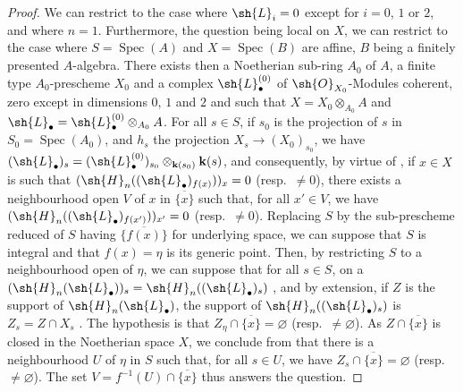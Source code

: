 \begin{proof}
\label{IV.9.9.6-proof}
We can restrict to the case where $\sh{L}_i=0$ except for $i=0$, $1$ or $2$, and where $n=1$.
Furthermore, the question being local on $X$, we can restrict to the case where $S=\operatorname{Spec}(A)$ and $X=\operatorname{Spec}(B)$ are affine, $B$ being a finitely presented $A$-algebra.
There exists then a Noetherian sub-ring $A_0$ of $A$, a finite type $A_0$-prescheme $X_0$ and a complex $\sh{L}_\bullet^{(0)}$ of $\sh{O}_{X_0}$-Modules coherent, zero except in dimensions $0$, $1$ and $2$ and such that $X=X_0\otimes_{A_0}A$ and $\sh{L}_\bullet=\sh{L}_\bullet^{(0)}\otimes_{A_0}A$.
For all $s\in S$, if $s_0$ is the projection of $s$ in $S_0=\operatorname{Spec}(A_0)$, and $h_s$ the projection $X_s\to(X_0)_{s_0}$, we have $(\sh{L}_\bullet)_s=(\sh{L}_\bullet^{(0)})_{s_0}\otimes_{\mathbf{k}(s_0)}\mathbf{k}(s)$, and consequently, by virtue of , if $x\in X$ is such that $(\sh{H}_n((\sh{L}_\bullet)_{f(x)}))_x=0$ (resp.~$\neq 0$), there exists a neighbourhood open $V$ of $x$ in $\overline{\{x\}}$ such that, for all $x'\in V$, we have $(\sh{H}_n((\sh{L}_\bullet)_{f(x')}))_{x'}=0$ (resp.~$\neq 0$).
Replacing $S$ by the sub-prescheme reduced of $S$ having $\overline{\{f(x)\}}$ for underlying space, we can suppose that $S$ is integral and that $f(x)=\eta$ is its generic point.
Then, by restricting $S$ to a neighbourhood open of $\eta$, we can suppose that for all $s\in S$, on a $(\sh{H}_n(\sh{L}_\bullet))_s=\sh{H}_n((\sh{L}_\bullet)_s)$ , and by extension, if $Z$ is the support of $\sh{H}_n(\sh{L}_\bullet)$, the support of $\sh{H}_n((\sh{L}_\bullet)_s)$ is $Z_s=Z\cap X_s$ .
The hypothesis is that $Z_\eta\cap\overline{\{x\}}=\varnothing$ (resp.~$\neq\varnothing$).
As $Z\cap\overline{\{x\}}$ is closed in the Noetherian space $X$, we conclude from  that there is a neighbourhood $U$ of $\eta$ in $S$ such that, for all $s\in U$, we have $Z_s\cap\overline{\{x\}}=\varnothing$ (resp.~$\neq\varnothing$).
The set $V=f^{-1}(U)\cap\overline{\{x\}}$ thus answers the question.
\end{proof}
